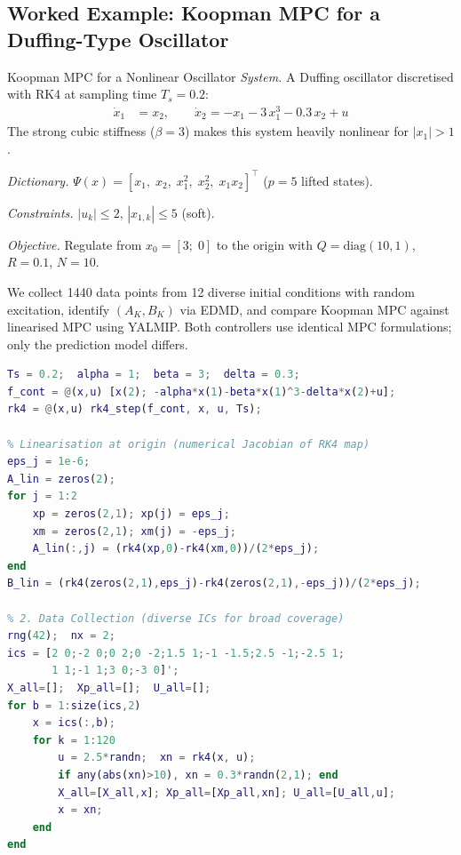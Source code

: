 \subsection{Worked Example: Koopman MPC for a Duffing-Type Oscillator}
\label{sec:koopman_example}

\begin{examplebox}{Koopman MPC for a Nonlinear Oscillator}
	\emph{System.} A Duffing oscillator discretised with RK4 at sampling time $T_s = 0.2$:
	\begin{align*}
		\dot{x}_1 &= x_2, \qquad
		\dot{x}_2 = -x_1 - 3\,x_1^3 - 0.3\,x_2 + u
	\end{align*}
	The strong cubic stiffness ($\beta = 3$) makes this system heavily nonlinear for $|x_1| > 1$.

	\emph{Dictionary.} $\Psi(x) = [x_1,\; x_2,\; x_1^2,\; x_2^2,\; x_1 x_2]^\top$ ($p = 5$ lifted states).

	\emph{Constraints.} $|u_k| \le 2$, $|x_{1,k}| \le 5$ (soft).

	\emph{Objective.} Regulate from $x_0 = [3;\; 0]$ to the origin with $Q = \text{diag}(10, 1)$, $R = 0.1$, $N = 10$.

	\solution

	We collect 1440 data points from 12 diverse initial conditions with random excitation, identify $(A_K, B_K)$ via EDMD, and compare Koopman MPC against linearised MPC using YALMIP. Both controllers use identical MPC formulations; only the prediction model differs.

\begin{lstlisting}[language=Matlab, caption={Koopman MPC vs Linearised MPC for a Duffing oscillator (RK4).}]
% 1. True Nonlinear Plant (RK4 discretisation)
Ts = 0.2;  alpha = 1;  beta = 3;  delta = 0.3;
f_cont = @(x,u) [x(2); -alpha*x(1)-beta*x(1)^3-delta*x(2)+u];
rk4 = @(x,u) rk4_step(f_cont, x, u, Ts);

% Linearisation at origin (numerical Jacobian of RK4 map)
eps_j = 1e-6;
A_lin = zeros(2);
for j = 1:2
    xp = zeros(2,1); xp(j) = eps_j;
    xm = zeros(2,1); xm(j) = -eps_j;
    A_lin(:,j) = (rk4(xp,0)-rk4(xm,0))/(2*eps_j);
end
B_lin = (rk4(zeros(2,1),eps_j)-rk4(zeros(2,1),-eps_j))/(2*eps_j);

% 2. Data Collection (diverse ICs for broad coverage)
rng(42);  nx = 2;
ics = [2 0;-2 0;0 2;0 -2;1.5 1;-1 -1.5;2.5 -1;-2.5 1;
       1 1;-1 1;3 0;-3 0]';
X_all=[];  Xp_all=[];  U_all=[];
for b = 1:size(ics,2)
    x = ics(:,b);
    for k = 1:120
        u = 2.5*randn;  xn = rk4(x, u);
        if any(abs(xn)>10), xn = 0.3*randn(2,1); end
        X_all=[X_all,x]; Xp_all=[Xp_all,xn]; U_all=[U_all,u];
        x = xn;
    end
end


\end{lstlisting}
\end{examplebox}
